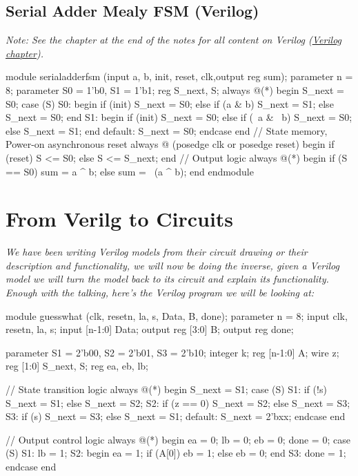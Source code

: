 \documentclass[12pt,openany]{book}
\begin{document}
\subsection{Serial Adder Mealy FSM (Verilog)}
 \textit{Note: See the chapter at the end of the notes for all content on Verilog (\hyperref[Verilog]{Verilog chapter}).}

\begin{minipage}[htp]{1\textwidth}
\begin{vhdl}
module serialadderfsm (input a, b, init, reset, clk,output reg sum);
	parameter n = 8;
	parameter S0 = 1'b0, S1 = 1'b1;
	reg S_next, S;
	always @(*) begin
		S_next = S0;
		case (S)
		S0: begin
			if (init) S_next = S0;
			else if (a & b) S_next = S1;
			else S_next = S0;
		end
		S1: begin
			if (init) S_next = S0;
			else if (~a & ~b) S_next = S0;
			else S_next = S1;
		end
		default: S_next = S0;
	endcase
	end	
	// State memory, Power-on asynchronous reset
	always @ (posedge clk or posedge reset) begin
		if (reset) S <= S0;
		else S <= S_next;
	end
	// Output logic
	always @(*) begin
		if (S == S0) sum = a ^ b;
		else sum = ~(a ^ b);
	end
endmodule
\end{vhdl}
\end{minipage}

\section{From Verilg to Circuits}

\textit{We have been writing Verilog models from their circuit drawing or their description and functionality, we will now be doing the inverse, given a Verilog model we will turn the model back to its circuit and explain its functionality.}
\newline
\textit{Enough with the talking, here's the Verilog program we will be looking at:}
\begin{vhdl}
module guesswhat (clk, resetn, la, s, Data, B, done);
parameter n = 8;
input clk, resetn, la, s;
input [n-1:0] Data;
output reg [3:0] B;
output reg done;

parameter S1 = 2'b00, S2 = 2'b01, S3 = 2'b10;
integer k;
reg [n-1:0] A;
wire z;
reg [1:0] S_next, S;
reg ea, eb, lb;

// State transition logic
always @(*) begin
	S_next = S1;
	case (S)
	S1: if (!s) S_next = S1;
		else S_next = S2;
	S2: if (z == 0) S_next = S2;
		else S_next = S3;
	S3: if (s) S_next = S3;
		else S_next = S1;
	default: S_next = 2'bxx;
	endcase
end

// Output control logic
always @(*) begin
	ea = 0;
	lb = 0;
	eb = 0;
	done = 0;
	case (S)
	S1: lb = 1;
	S2: begin
		ea = 1;
		if (A[0]) eb = 1;
		else eb = 0;
	end
	S3: done = 1;
	endcase
end
\end{vhdl}
\end{document}
